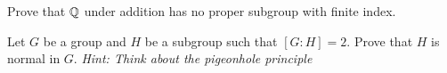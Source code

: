\documentclass[./main.tex]{subfiles}
\begin{document}
\begin{exercise}
    Prove that $\mathbb{Q}$ under addition has no proper subgroup with finite index.
\end{exercise}

\begin{exercise}
\label{ex:index-2-subgroups-normal}
    Let $G$ be a group and $H$ be a subgroup such that $[G:H] = 2$. Prove that
    $H$ is normal in $G$. \textit{Hint: Think about the pigeonhole principle}
\end{exercise}
\end{document}
